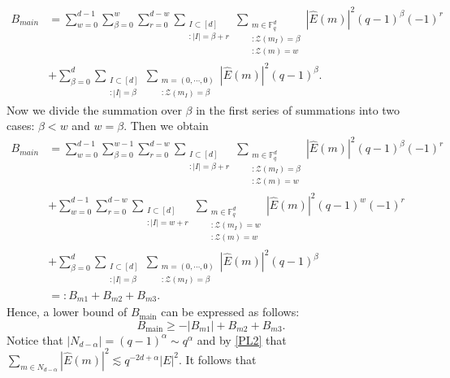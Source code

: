\documentclass[a4paper,11pt]{amsart}
\numberwithin{equation}{section}
\begin{document}
\begin{align*}
    B_{main} 
    &=
    \sum_{w = 0}^{d-1} \sum_{\beta = 0}^{w} \sum_{r = 0}^{d - w} \sum_{\substack{I \subset [d] \\ :|I| = \beta + r }} \sum_{\substack{{m \in \mathbb{F}_q^d}  \\  { :\mathcal{Z}(m_I) = \beta} \\ {:\mathcal{Z}(m) = w}}} |\widehat{E}(m)|^2 (q - 1)^{\beta} (-1)^r\\
    &+
    \sum_{\beta = 0}^d\sum_{\substack{I \subset [d] \\ :|I| = \beta}} \sum_{\substack{{ m = (0,\cdots,0)}  \\  { :\mathcal{Z}(m_I) = \beta}}} |\widehat{E}(m)|^2 (q - 1)^{\beta}.
\end{align*}
Now we divide the summation over $\beta$ in the first series of summations into two cases: $\beta < w$ and $w=\beta$.
Then we obtain
\begin{align*}
    B_{main}
    &=
    \sum_{w = 0}^{d-1} \sum_{\beta = 0}^{w-1} \sum_{r = 0}^{d - w} \sum_{\substack{I \subset [d] \\ :|I| = \beta + r }} \sum_{\substack{{m \in \mathbb{F}_q^d}  \\  { :\mathcal{Z}(m_I) = \beta} \\ {:\mathcal{Z}(m) = w}}} |\widehat{E}(m)|^2 (q - 1)^{\beta} (-1)^r \\
    &+
    \sum_{w = 0}^{d-1} \sum_{r = 0}^{d - w} \sum_{\substack{I \subset [d] \\ :|I| = w + r }} \sum_{\substack{{m \in \mathbb{F}_q^d}  \\  { :\mathcal{Z}(m_I) = w} \\ {:\mathcal{Z}(m) = w}}} |\widehat{E}(m)|^2 (q - 1)^{w} (-1)^r\\
    &+
    \sum_{\beta = 0}^d\sum_{\substack{I \subset [d] \\ :|I| = \beta}} \sum_{\substack{{ m = (0,\cdots,0)}  \\  { :\mathcal{Z}(m_I) = \beta}}} |\widehat{E}(m)|^2 (q - 1)^{\beta}\\
    &=: B_{m1} + B_{m2}+B_{m3}.
\end{align*}
Hence, a lower bound of $B_{\text{main}}$ can be expressed as follows:
\begin{equation}\label{mineq2}
    B_{\text{main}} \geq -|B_{m1}| + B_{m2} +B_{m3}.
\end{equation}
Notice that $|N_{d-\alpha}|=(q-1)^\alpha\sim q^\alpha$  and 
 by \eqref{PL2} that $\sum\limits_{m \in N_{d-\alpha}} |\widehat{E}(m)|^2 \lesssim q^{-2d+\alpha}|E|^2$. It follows that
\end{document}
